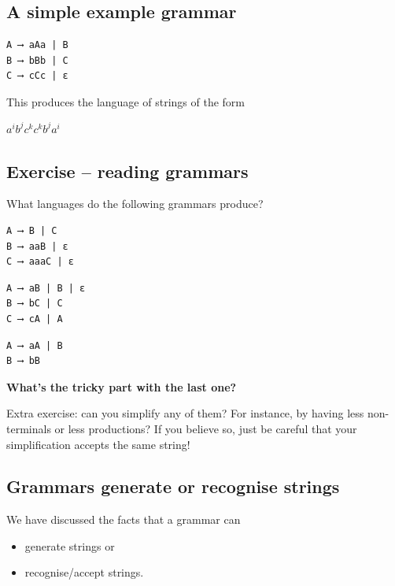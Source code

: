 \documentclass[11pt]{article}
\theoremstyle{definition}
\begin{document}
\subsection{A simple example grammar}
\label{sec:orge73485d}

\begin{verbatim}
A ⟶ aAa | B
B ⟶ bBb | C
C ⟶ cCc | ε
\end{verbatim}

This produces the language of strings of
the form
\begin{center}
\(a^{i}b^{j}c^{k}c^{k}b^{j}a^{i}\)
\end{center}

\subsection{Exercise – reading grammars}
\label{sec:org7882926}

What languages do the following grammars produce?

\begin{verbatim}
A ⟶ B | C
B ⟶ aaB | ε
C ⟶ aaaC | ε
\end{verbatim}

\begin{verbatim}
A ⟶ aB | B | ε
B ⟶ bC | C
C ⟶ cA | A
\end{verbatim}

\begin{verbatim}
A ⟶ aA | B
B ⟶ bB
\end{verbatim}

\textbf{What's the tricky part with the last one?}

Extra exercise: can you simplify any of them?
For instance, by having less non-terminals or less productions?
If you believe so, just be careful that
your simplification accepts the same string!

\subsection{Grammars generate or recognise strings}
\label{sec:org75aa73c}

We have discussed the facts that a grammar can
\begin{itemize}
\item generate strings or
\item recognise/accept strings.
\end{itemize}
\end{document}
